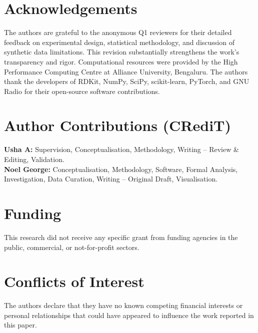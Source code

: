 \documentclass[sensors,article,submit,pdftex]{mdpi}
\begin{document}
\section*{Acknowledgements}
The authors are grateful to the anonymous Q1 reviewers for their detailed feedback on experimental design, statistical methodology, and discussion of synthetic data limitations. This revision substantially strengthens the work's transparency and rigor. Computational resources were provided by the High Performance Computing Centre at Alliance University, Bengaluru. The authors thank the developers of RDKit, NumPy, SciPy, scikit-learn, PyTorch, and GNU Radio for their open-source software contributions.

\section*{Author Contributions (CRediT)}
\textbf{Usha A:} Supervision, Conceptualisation, Methodology, Writing -- Review \& Editing, Validation.\\
\textbf{Noel George:} Conceptualisation, Methodology, Software, Formal Analysis, Investigation, Data Curation, Writing -- Original Draft, Visualisation.

\section*{Funding}
This research did not receive any specific grant from funding agencies in the public, commercial, or not-for-profit sectors.

\section*{Conflicts of Interest}
The authors declare that they have no known competing financial interests or personal relationships that could have appeared to influence the work reported in this paper.

\end{document}
